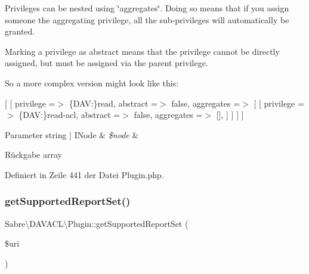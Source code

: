 Privileges can be nested using \char`\"{}aggregates\char`\"{}. Doing so means that if you assign someone the aggregating privilege, all the sub-\/privileges will automatically be granted.

Marking a privilege as abstract means that the privilege cannot be directly assigned, but must be assigned via the parent privilege.

So a more complex version might look like this\+:

\mbox{[} \mbox{[} \textquotesingle{}privilege\textquotesingle{} =$>$ \textquotesingle{}\{D\+AV\+:\}read\textquotesingle{}, \textquotesingle{}abstract\textquotesingle{} =$>$ false, \textquotesingle{}aggregates\textquotesingle{} =$>$ \mbox{[} \mbox{[} \textquotesingle{}privilege\textquotesingle{} =$>$ \textquotesingle{}\{D\+AV\+:\}read-\/acl\textquotesingle{}, \textquotesingle{}abstract\textquotesingle{} =$>$ false, \textquotesingle{}aggregates\textquotesingle{} =$>$ \mbox{[}\mbox{]}, \mbox{]} \mbox{]} \mbox{]} \mbox{]}


\begin{DoxyParams}[1]{Parameter}
string | I\+Node & {\em \$node} & \\
\hline
\end{DoxyParams}
\begin{DoxyReturn}{Rückgabe}
array 
\end{DoxyReturn}


Definiert in Zeile 441 der Datei Plugin.\+php.

\mbox{\label{class_sabre_1_1_d_a_v_a_c_l_1_1_plugin_a449106594e829494885c821b8418b6b3}} 
\subsubsection{\texorpdfstring{get\+Supported\+Report\+Set()}{getSupportedReportSet()}}
{\footnotesize\ttfamily Sabre\textbackslash{}\+D\+A\+V\+A\+C\+L\textbackslash{}\+Plugin\+::get\+Supported\+Report\+Set (\begin{DoxyParamCaption}\item[{}]{\$uri }\end{DoxyParamCaption})}

